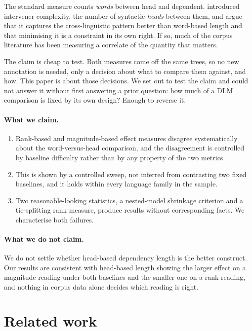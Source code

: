 \documentclass[11pt]{article}
\begin{document}
The standard measure counts \emph{words} between head and dependent. \citet{yadav2020wordorder} introduced intervener complexity, the number of syntactic \emph{heads} between them, and \citet{yadav2022reappraisal} argue that it captures the cross-linguistic pattern better than word-based length and that minimising it is a constraint in its own right. If so, much of the corpus literature has been measuring a correlate of the quantity that matters.

The claim is cheap to test. Both measures come off the same trees, so no new annotation is needed, only a decision about what to compare them against, and how. This paper is about those decisions. We set out to test the claim and could not answer it without first answering a prior question: how much of a DLM comparison is fixed by its own design? Enough to reverse it.

\paragraph{What we claim.}
\begin{enumerate}
  \item Rank-based and magnitude-based effect measures disagree systematically about the word-versus-head comparison, and the disagreement is controlled by baseline difficulty rather than by any property of the two metrics.
  \item This is shown by a controlled sweep, not inferred from contrasting two fixed baselines, and it holds within every language family in the sample.
  \item Two reasonable-looking statistics, a nested-model shrinkage criterion and a tie-splitting rank measure, produce results without corresponding facts. We characterise both failures.
\end{enumerate}

\paragraph{What we do not claim.} We do not settle whether head-based dependency length is the better construct. Our results are consistent with head-based length showing the larger effect on a magnitude reading under both baselines and the smaller one on a rank reading, and nothing in corpus data alone decides which reading is right.

\section{Related work}
\label{sec:related}
\end{document}
